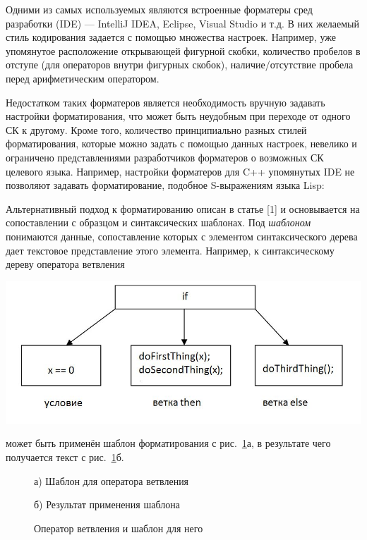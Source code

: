 \documentclass[conference]{IEEEtran}
\begin{document}
Одними из самых используемых являются встроенные форматеры
сред разработки (IDE) --- IntelliJ IDEA, Eclipse, Visual Studio и т.д.
В них желаемый стиль кодирования задается с помощью множества настроек.
Например, уже упомянутое расположение открывающей фигурной скобки,
количество пробелов в отступе (для операторов внутри фигурных скобок),
наличие/отсутствие пробела перед арифметическим оператором.

Недостатком таких форматеров является необходимость вручную задавать
настройки форматирования, что может быть неудобным при переходе
от одного СК к другому.
Кроме того, количество принципиально разных стилей форматирования,
которые можно задать с помощью данных настроек, невелико и ограничено
представлениями разработчиков форматеров о возможных СК целевого языка.
Например, настройки форматеров для C++ упомянутых IDE не позволяют задавать
форматирование, подобное S-выражениям языка Lisp:



Альтернативный подход к форматированию описан в статье [1] %
и основывается на сопоставлении с образцом и синтаксических шаблонах.
Под \emph{шаблоном} понимаются данные, сопоставление которых с элементом синтаксического дерева дает текстовое представление этого элемента.
Например, к синтаксическому дереву оператора ветвления
\vspace{.3cm}

{
\centering
\includegraphics[width=.5\textwidth]{images/ifTree.jpg}
}

\vspace{-.5cm}
\noindent
может быть применён шаблон форматирования с рис.~\ref{fig:tmpltcodeintro}а,
в результате чего получается текст с рис.~\ref{fig:tmpltcodeintro}б.

\begin{figure}[ht]
\noindent\begin{minipage}{.2\textwidth}
    
\caption*{а) Шаблон для оператора ветвления}    
\end{minipage}\hfill
\begin{minipage}{.25\textwidth}
    
\caption*{б) Результат применения шаблона}    
\end{minipage}
\caption{Оператор ветвления и шаблон для него}    
\label{fig:tmpltcodeintro}
\end{figure}
\end{document}
